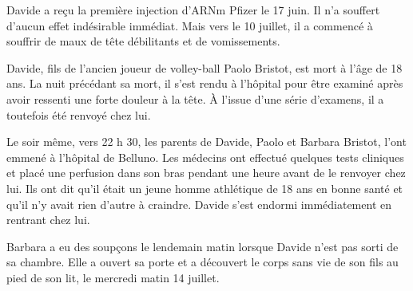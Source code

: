 Davide a reçu la première injection d'ARNm Pfizer le 17 juin. Il n'a souffert
d'aucun effet indésirable immédiat. Mais vers le 10 juillet, il a commencé à
souffrir de maux de tête débilitants et de vomissements.

Davide, fils de l'ancien joueur de volley-ball Paolo Bristot, est mort à l'âge
de 18 ans. La nuit précédant sa mort, il s'est rendu à l'hôpital pour être
examiné après avoir ressenti une forte douleur à la tête. À l'issue d'une série
d'examens, il a toutefois été renvoyé chez lui.

Le soir même, vers 22 h 30, les parents de Davide, Paolo et Barbara Bristot,
l'ont emmené à l'hôpital de Belluno. Les médecins ont effectué quelques tests
cliniques et placé une perfusion dans son bras pendant une heure avant de le
renvoyer chez lui. Ils ont dit qu'il était un jeune homme athlétique de 18 ans
en bonne santé et qu'il n'y avait rien d'autre à craindre. Davide s'est endormi
immédiatement en rentrant chez lui.

Barbara a eu des soupçons le lendemain matin lorsque Davide n'est pas sorti de
sa chambre. Elle a ouvert sa porte et a découvert le corps sans vie de son fils
au pied de son lit, le mercredi matin 14 juillet.


